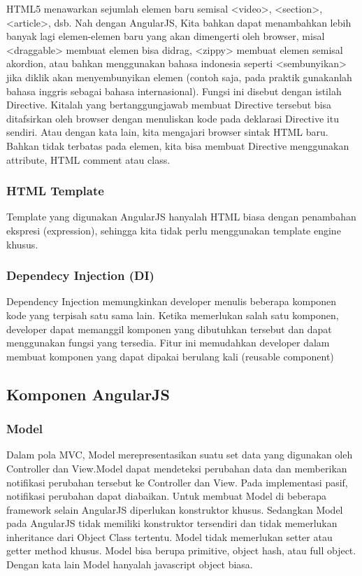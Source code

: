 	HTML5 menawarkan sejumlah elemen baru semisal <video>, <section>, <article>, dsb. Nah dengan AngularJS, Kita bahkan dapat menambahkan lebih banyak lagi elemen-elemen baru yang akan dimengerti oleh browser, misal <draggable> membuat elemen bisa didrag, <zippy> membuat elemen semisal akordion, atau bahkan menggunakan bahasa indonesia seperti <sembunyikan> jika diklik akan menyembunyikan elemen (contoh saja, pada praktik gunakanlah bahasa inggris sebagai bahasa internasional). Fungsi ini disebut dengan istilah Directive. Kitalah yang bertanggungjawab membuat Directive tersebut bisa ditafsirkan oleh browser dengan menuliskan kode pada deklarasi Directive itu sendiri. Atau dengan kata lain, kita mengajari browser sintak HTML baru. Bahkan tidak terbatas pada elemen, kita bisa membuat Directive menggunakan attribute, HTML comment atau class.

\subsubsection{HTML Template}
\label{subsub: HTMLTemplate}

	Template yang digunakan AngularJS hanyalah HTML biasa dengan penambahan ekspresi (expression), sehingga kita tidak perlu menggunakan template engine khusus.

\subsubsection{Dependecy Injection (DI)}
\label{subsub: DI}

	Dependency Injection memungkinkan developer menulis beberapa komponen kode yang terpisah satu sama lain. Ketika memerlukan salah satu komponen, developer dapat memanggil komponen yang dibutuhkan tersebut dan dapat menggunakan fungsi yang tersedia. Fitur ini memudahkan developer dalam membuat komponen yang dapat dipakai berulang kali (reusable component)

\subsection{Komponen AngularJS}
\label{sub: komponenAngularJS}
	


\subsubsection{Model}
\label{subsub: model}

	Dalam pola MVC, Model merepresentasikan suatu set data yang digunakan oleh Controller dan View.Model dapat mendeteksi perubahan data dan memberikan notifikasi perubahan tersebut ke Controller dan View. Pada implementasi pasif, notifikasi perubahan dapat diabaikan. Untuk membuat Model di beberapa framework selain AngularJS diperlukan konstruktor khusus. Sedangkan Model pada AngularJS tidak memiliki konstruktor tersendiri dan tidak memerlukan inheritance dari Object Class tertentu. Model tidak memerlukan setter atau getter method khusus. Model bisa berupa primitive, object hash, atau full object. Dengan kata lain Model hanyalah javascript object biasa.

